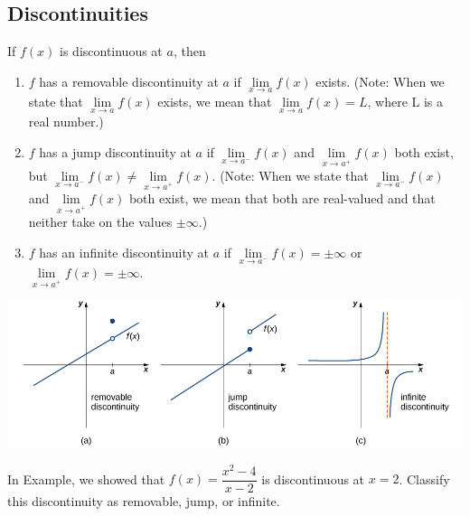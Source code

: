 \hypertarget{discontinuities}{%
\subsection{Discontinuities}\label{discontinuities}}

\begin{definition}

If \(f(x)\) is discontinuous at \(a\), then

\begin{enumerate}[sepno]
\item
  \(f\) has a removable discontinuity at \(a\) if
  \(\lim\limits_{x\to a}f(x)\) exists. (Note: When we state that
  \(\lim\limits_{x\to a}f(x)\) exists, we mean that
  \(\lim\limits_{x\to a}f(x)=L\), where L is a real number.)
\item
  \(f\) has a jump discontinuity at \(a\) if
  \(\lim\limits_{x\to a^-}f(x)\) and \(\lim\limits_{x\to a^+}f(x)\) both
  exist, but
  \(\lim\limits_{x\to a^-}f(x)\neq \lim\limits_{x\to a^+}f(x)\). (Note:
  When we state that \(\lim\limits_{x\to a^-}f(x)\) and
  \(\lim\limits_{x\to a^+}f(x)\) both exist, we mean that both are
  real-valued and that neither take on the values \(\pm\infty\).)
\item
  \(f\) has an infinite discontinuity at \(a\) if
  \(\lim\limits_{x\to a^-}f(x)=\pm\infty\) or
  \(\lim\limits_{x\to a^+}f(x)=\pm\infty\).
\end{enumerate}

\end{definition}

\begin{fullwidth}
  \includegraphics[width=1.2\textwidth]{img/2020-09-02-22-17-09.png}
\end{fullwidth}

\begin{example}

In Example, we showed that \(f(x)=\dfrac{x^2-4}{x-2}\) is discontinuous
at \(x=2\). Classify this discontinuity as removable, jump, or infinite.

\end{example}
\vspace*{6\baselineskip}

